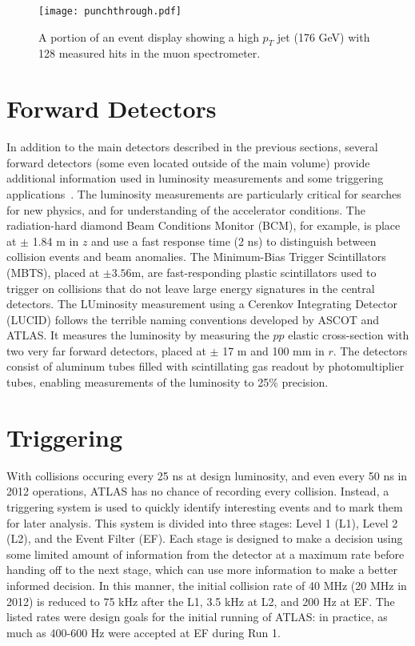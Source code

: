 
\begin{figure}
\centering
\texttt{[image: punchthrough.pdf]}
\label{fig:detector:punchthrough}
\caption{A portion of an event display showing a high $p_T$ jet (176 GeV) with 128 measured hits in the muon spectrometer.}
\end{figure}


\section{Forward Detectors}

In addition to the main detectors described in the previous sections, several forward detectors (some even located outside of the main volume) provide additional information used in luminosity measurements and some triggering applications~\cite{ATLASPaper}. The luminosity measurements are particularly critical for searches for new physics, and for understanding of the accelerator conditions. The radiation-hard diamond Beam Conditions Monitor (BCM), for example, is place at $\pm$ 1.84 m in $z$ and use a fast response time (2 ns) to distinguish between collision events and beam anomalies. The Minimum-Bias Trigger Scintillators (MBTS), placed at $\pm 3.56$m, are fast-responding plastic scintillators used to trigger on collisions that do not leave large energy signatures in the central detectors. The LUminosity measurement using a Cerenkov Integrating Detector (LUCID) follows the terrible naming conventions developed by ASCOT and ATLAS. It measures the luminosity by measuring the $pp$ elastic cross-section with two very far forward detectors, placed at $\pm$ 17 m and 100 mm in $r$. The detectors consist of aluminum tubes filled with scintillating gas readout by photomultiplier tubes, enabling measurements of the luminosity to 25$\%$ precision.

\section{Triggering}

With collisions occuring every 25 ns at design luminosity, and even every 50 ns in 2012 operations, ATLAS has no chance of recording every collision. Instead, a triggering system is used to quickly identify interesting events and to mark them for later analysis\cite{ATLASPaper,Trigger2010}. This system is divided into three stages: Level 1 (L1), Level 2 (L2), and the Event Filter (EF). Each stage is designed to make a decision using some limited amount of information from the detector at a maximum rate before handing off to the next stage, which can use more information to make a better informed decision. In this manner, the initial collision rate of 40 MHz (20 MHz in 2012) is reduced to 75 kHz after the L1, 3.5 kHz at L2, and 200 Hz at EF. The listed rates were design goals for the initial running of ATLAS: in practice, as much as 400-600 Hz were accepted at EF during Run 1.


